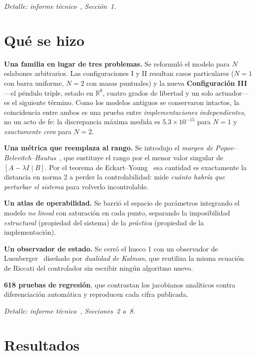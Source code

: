 \documentclass[11pt,letterpaper]{article}
\newcommand{\R}{\mathbb{R}}
\begin{document}
\noindent\emph{Detalle: informe técnico~\cite{tecnico2}, Sección~1.}

\section{Qué se hizo}

\textbf{Una familia en lugar de tres problemas.} Se reformuló el modelo para $N$
eslabones arbitrarios. Las configuraciones I y II resultan casos particulares
($N=1$ con barra uniforme, $N=2$ con masas puntuales) y la nueva
\textbf{Configuración III} ---el péndulo triple, estado en $\R^8$, cuatro grados
de libertad y un solo actuador--- es el siguiente término. Como los modelos
antiguos se conservaron intactos, la coincidencia entre ambos es una prueba
entre \emph{implementaciones independientes}, no un acto de fe: la discrepancia
máxima medida es $5.3\times10^{-15}$ para $N=1$ y \emph{exactamente cero} para
$N=2$.

\textbf{Una métrica que reemplaza al rango.} Se introdujo el \emph{margen de
Popov--Belevitch--Hautus}~\cite{chen1999}, que sustituye el rango por el menor
valor singular de
$[A-\lambda I\mid B]$. Por el teorema de Eckart--Young~\cite{eckart1936} esa cantidad es
exactamente la distancia en norma 2 a perder la controlabilidad: mide
\emph{cuánto habría que perturbar el sistema} para volverlo incontrolable.

\textbf{Un atlas de operabilidad.} Se barrió el espacio de parámetros integrando
el modelo \emph{no lineal} con saturación en cada punto, separando la
imposibilidad \emph{estructural} (propiedad del sistema) de la \emph{práctica}
(propiedad de la implementación).

\textbf{Un observador de estado.} Se cerró el hueco 1 con un observador de
Luenberger~\cite{ogata2010} diseñado por \emph{dualidad de Kalman}, que
reutiliza la misma ecuación de Riccati del controlador sin escribir ningún
algoritmo nuevo.

\textbf{618 pruebas de regresión}, que contrastan los jacobianos analíticos
contra diferenciación automática y reproducen cada cifra publicada.

\noindent\emph{Detalle: informe técnico~\cite{tecnico2}, Secciones~2 a~8.}

\section{Resultados}
\end{document}
